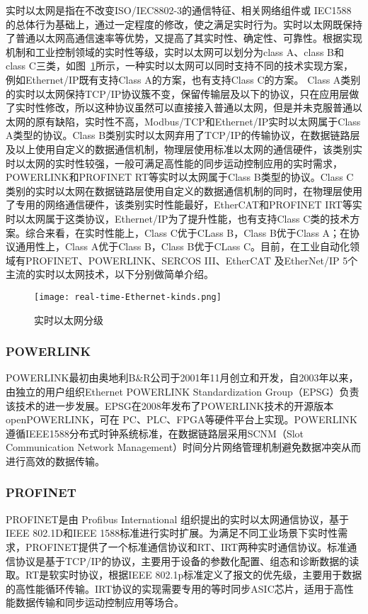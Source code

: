 实时以太网是指在不改变ISO/IEC8802-3的通信特征、相关网络组件或 IEC1588 的总体行为基础上，通过一定程度的修改，使之满足实时行为。实时以太网既保持了普通以太网高通信速率等优势，又提高了其实时性、确定性、可靠性\cite{Hao2018}。根据实现机制和工业控制领域的实时性等级，实时以太网可以划分为class A、class B和class C三类\cite{wei2013}，如图~\ref{fig:real-time Ethernet kinds}所示，一种实时以太网可以同时支持不同的技术实现方案，例如Ethernet/IP既有支持Class A的方案，也有支持Class C的方案。
Class A类别的实时以太网保持TCP/IP协议簇不变，保留传输层及以下的协议，只在应用层做了实时性修改，所以这种协议虽然可以直接接入普通以太网，但是并未克服普通以太网的原有缺陷，实时性不高，Modbus/TCP和Ethernet/IP实时以太网属于Class A类型的协议。Class B类别实时以太网弃用了TCP/IP的传输协议，在数据链路层及以上使用自定义的数据通信机制，物理层使用标准以太网的通信硬件，该类别实时以太网的实时性较强，一般可满足高性能的同步运动控制应用的实时需求，POWERLINK和PROFINET RT等实时以太网属于Class B类型的协议。Class C类别的实时以太网在数据链路层使用自定义的数据通信机制的同时，在物理层使用了专用的网络通信硬件，该类别实时性能最好，EtherCAT和PROFINET IRT等实时以太网属于这类协议，Ethernet/IP为了提升性能，也有支持Class C类的技术方案。综合来看，在实时性能上，Class C优于CLass B，Class B优于Class A；在协议通用性上，Class A优于Class B，Class B优于CLass C。目前，在工业自动化领域有PROFINET、POWERLINK、SERCOS III、EtherCAT 及EtherNet/IP 5个主流的实时以太网技术，以下分别做简单介绍。

\begin{figure}[!htb]
  \centering
  \texttt{[image: real-time-Ethernet-kinds.png]}
  \caption{实时以太网分级}
  \label{fig:real-time Ethernet kinds}
\end{figure}

\subsubsection{POWERLINK}
POWERLINK最初由奥地利B$\&$R公司于2001年11月创立和开发，自2003年以来，由独立的用户组织Ethernet POWERLINK Standardization Group（EPSG）负责该技术的进一步发展\cite{ESPG}。EPSG在2008年发布了POWERLINK技术的开源版本openPOWERLINK，可在 PC、PLC、FPGA等硬件平台上实现\cite{oplk}。POWERLINK遵循IEEE1588分布式时钟系统标准，在数据链路层采用SCNM（Slot Communication Network Management）时间分片网络管理机制避免数据冲突从而进行高效的数据传输。

\subsubsection{PROFINET}
PROFINET是由 Profibus International 组织提出的实时以太网通信协议，基于IEEE 802.1D和IEEE 1588标准进行实时扩展\cite{Feld2005}。为满足不同工业场景下实时性需求，PROFINET提供了一个标准通信协议和RT、IRT两种实时通信协议。标准通信协议是基于TCP/IP的协议，主要用于设备的参数化配置、组态和诊断数据的读取。RT是软实时协议，根据IEEE 802.1p标准定义了报文的优先级，主要用于数据的高性能循环传输。IRT协议的实现需要专用的等时同步ASIC芯片，适用于高性能数据传输和同步运动控制应用等场合。

